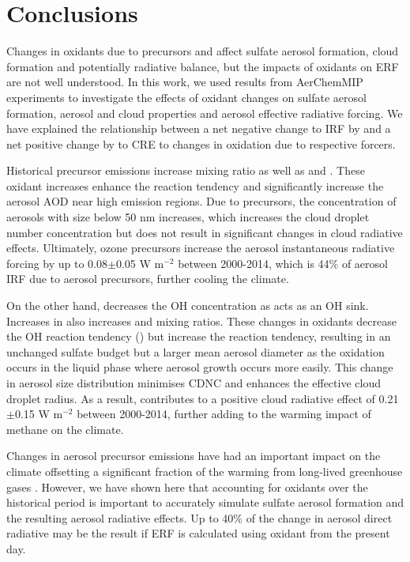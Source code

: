 


\section{Conclusions}

Changes in oxidants due to  precursors and  affect sulfate aerosol formation, cloud formation and potentially radiative balance, but the impacts of oxidants on ERF are not well understood. In this work, we used results from AerChemMIP experiments to investigate the effects of oxidant changes on sulfate aerosol formation, aerosol and cloud properties and aerosol effective radiative forcing. We have explained the relationship between a net negative change to IRF by  and a net positive change by  to CRE to changes in oxidation due to respective forcers.  

Historical  precursor emissions increase  mixing ratio as well as  and . These oxidant increases enhance the  reaction tendency and significantly increase the aerosol AOD near high  emission regions.  Due to  precursors, the concentration of aerosols with size below 50 nm increases, which increases the cloud droplet number concentration but does not result in significant changes in cloud radiative effects. Ultimately, ozone precursors increase the aerosol instantaneous radiative forcing by up to 0.08$\pm$0.05 W m$^{-2}$ between 2000-2014, which is 44\% of aerosol IRF due to aerosol precursors, further cooling the climate.

On the other hand,  decreases the OH concentration as  acts as an OH sink. Increases in  also increases  and  mixing ratios. These changes in oxidants decrease the OH reaction tendency () but increase the  reaction tendency, resulting in an unchanged sulfate budget but a larger mean aerosol diameter as the  oxidation occurs in the liquid phase where aerosol growth occurs more easily. This change in aerosol size distribution minimises CDNC and enhances the effective cloud droplet radius. As a result, contributes to a positive cloud radiative effect of 0.21$\pm$0.15 W m$^{-2}$ between 2000-2014, further adding to the warming impact of methane on the climate.

Changes in aerosol precursor emissions have had an important impact on the climate offsetting a significant fraction of the warming from long-lived greenhouse gases \citep{szopaShortlivedClimateForcers2021}. However, we have shown here that accounting for oxidants over the historical period is important to accurately simulate sulfate aerosol formation and the resulting aerosol radiative effects. Up to 40\% of the change in aerosol direct radiative may be the result if ERF is calculated using oxidant from the present day.  
